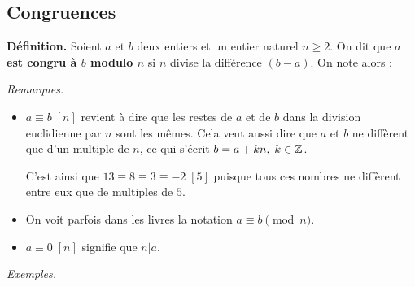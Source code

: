 \documentclass[11pt,class=report,crop=false]{standalone}
\begin{document}







\bigskip


\subsection*{Congruences}


\textbf{Définition.}
Soient $a$ et $b$ deux entiers et un entier naturel $n\geq2$. 
On dit que \boldmath \textbf{$a$ est congru à $b$ modulo $n$ }\unboldmath si $n$ divise la différence $(b-a)$. On note alors :

\emph{Remarques.}
\begin{itemize}
        \item $a \equiv b \;[n]$ revient à dire que les restes de $a$ et de $b$ dans la division euclidienne par $n$ sont les mêmes. Cela veut aussi dire que $a$ et $b$ ne diffèrent que d'un multiple de $n$, ce qui s'écrit $b = a + kn, \; k \in \mathbb{Z}$.
        
        C'est ainsi que $13 \equiv 8 \equiv 3 \equiv -2 \; [5]$ puisque tous ces nombres ne diffèrent entre eux que de multiples de $5$.
                
        \item On voit parfois dans les livres la notation $a\equiv b \pmod n$.
        
        \item $a \equiv 0 \; [n]$ signifie que $n|a$.
\end{itemize}

\emph{Exemples.}
\end{document}
